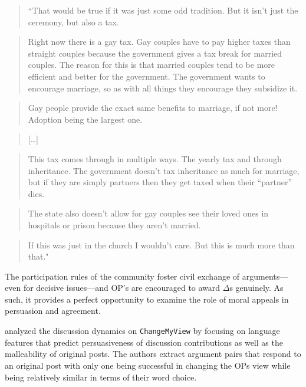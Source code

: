 \documentclass[12pt,]{article}
\begin{document}
\begin{quote}
``That would be true if it was just some odd tradition. But it isn't
just the ceremony, but also a tax.
\end{quote}

\begin{quote}
Right now there is a gay tax. Gay couples have to pay higher taxes than
straight couples because the government gives a tax break for married
couples. The reason for this is that married couples tend to be more
efficient and better for the government. The government wants to
encourage marriage, so as with all things they encourage they subsidize
it.
\end{quote}

\begin{quote}
Gay people provide the exact same benefits to marriage, if not more!
Adoption being the largest one.
\end{quote}

\begin{quote}
{[}\ldots{}{]}
\end{quote}

\begin{quote}
This tax comes through in multiple ways. The yearly tax and through
inheritance. The government doesn't tax inheritance as much for
marriage, but if they are simply partners then they get taxed when their
``partner'' dies.
\end{quote}

\begin{quote}
The state also doesn't allow for gay couples see their loved ones in
hospitals or prison because they aren't married.
\end{quote}

\begin{quote}
If this was just in the church I wouldn't care. But this is much more
than that."
\end{quote}

The participation rules of the community foster civil exchange of
arguments---even for decisive issues---and OP's are encouraged to award
\(\Delta\)s genuinely. As such, it provides a perfect opportunity to
examine the role of moral appeals in persuasion and agreement.

\citet{tan2016winning} analyzed the discussion dynamics on
\texttt{ChangeMyView} by focusing on language features that predict
persuasiveness of discussion contributions as well as the malleability
of original posts. The authors extract argument pairs that respond to an
original post with only one being successful in changing the OPs view
while being relatively similar in terms of their word choice.
\end{document}
